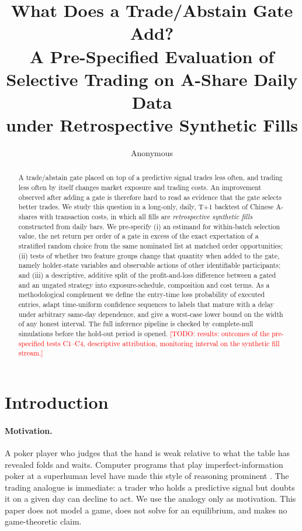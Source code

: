 \documentclass[11pt]{article}
\title{What Does a Trade/Abstain Gate Add?\\
A Pre-Specified Evaluation of Selective Trading on A-Share Daily Data\\
under Retrospective Synthetic Fills}
\author{Anonymous}
\date{}
\theoremstyle{remark}
\newcommand{\todo}[1]{\textcolor{red}{[TODO: #1]}}
\begin{document}
\maketitle

\begin{abstract}
A trade/abstain gate placed on top of a predictive signal trades less often, and trading less
often by itself changes market exposure and trading costs. An improvement observed after adding a
gate is therefore hard to read as evidence that the gate selects better trades. We study this
question in a long-only, daily, T+1 backtest of Chinese A-shares with transaction costs, in which
all fills are \emph{retrospective synthetic fills} constructed from daily bars. We pre-specify
(i) an estimand for within-batch selection value, the net return per order of a gate in excess of
the exact expectation of a stratified random choice from the same nominated list at matched order
opportunities; (ii) tests of whether two feature groups change that quantity when added to the
gate, namely holder-state variables and observable actions of other identifiable participants;
and (iii) a descriptive, additive split of the profit-and-loss difference between a gated and an
ungated strategy into exposure-schedule, composition and cost terms. As a methodological
complement we define the entry-time loss probability of executed entries, adapt time-uniform
confidence sequences to labels that mature with a delay under arbitrary same-day dependence, and
give a worst-case lower bound on the width of any honest interval. The full inference pipeline is
checked by complete-null simulations before the hold-out period is opened.
\todo{results: outcomes of the pre-specified tests C1--C4, descriptive attribution, monitoring
interval on the synthetic fill stream.}
\end{abstract}

\section{Introduction}
\label{sec:intro}

\paragraph{Motivation.}
A poker player who judges that the hand is weak relative to what the table has revealed folds
and waits. Computer programs that play imperfect-information poker at a superhuman level have
made this style of reasoning prominent \citep{brown2018libratus,brown2019pluribus}. The trading
analogue is immediate: a trader who holds a predictive signal but doubts it on a given day can
decline to act. We use the analogy only as motivation. This paper does not model a game, does not
solve for an equilibrium, and makes no game-theoretic claim.
\end{document}
